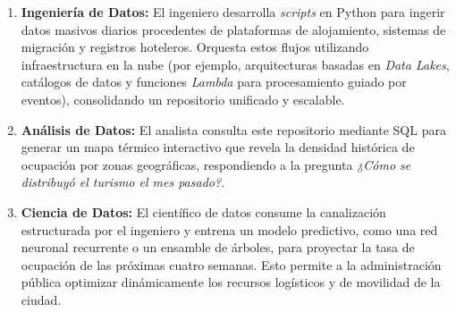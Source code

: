 \begin{enumerate}
    \item \textbf{Ingeniería de Datos:} El ingeniero desarrolla \textit{scripts} en Python para ingerir datos masivos diarios procedentes de plataformas de alojamiento, sistemas de migración y registros hoteleros. Orquesta estos flujos utilizando infraestructura en la nube (por ejemplo, arquitecturas basadas en \textit{Data Lakes}, catálogos de datos y funciones \textit{Lambda} para procesamiento guiado por eventos), consolidando un repositorio unificado y escalable.
    \item \textbf{Análisis de Datos:} El analista consulta este repositorio mediante SQL para generar un mapa térmico interactivo que revela la densidad histórica de ocupación por zonas geográficas, respondiendo a la pregunta \textit{¿Cómo se distribuyó el turismo el mes pasado?}.
    \item \textbf{Ciencia de Datos:} El científico de datos consume la canalización estructurada por el ingeniero y entrena un modelo predictivo, como una red neuronal recurrente o un ensamble de árboles, para proyectar la tasa de ocupación de las próximas cuatro semanas. Esto permite a la administración pública optimizar dinámicamente los recursos logísticos y de movilidad de la ciudad.
\end{enumerate}